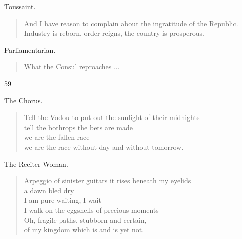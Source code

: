 \documentclass[letterpaper,article,12pt,oneside,notitlepage]{memoir}
\begin{document}
\begin{center}Toussaint.\end{center}

\begin{verse}
\hspace{1cm} And I have reason to complain about the ingratitude of the Republic. \\
Industry is reborn, order reigns, the country is prosperous. \\
\end{verse}

\begin{center}Parliamentarian.\end{center}

\begin{verse}
What the Consul reproaches ... \\
\end{verse}

\clearpage

\href{http://cesaire.elotroalex.com/chiens/chiens/p059.html}{59}

\begin{center}The Chorus.\end{center}

\begin{verse}
Tell the Vodou to put out the sunlight of their midnights \\
tell the bothrops the bets are made \\
we are the fallen race \\
we are the race without day and without tomorrow. \\
\end{verse}

\begin{center}The Reciter Woman.\end{center}

\begin{verse}
Arpeggio of sinister guitars it rises beneath my eyelids \\
a dawn bled dry \\
I am pure waiting, I wait \\
I walk on the eggshells of precious moments \\
Oh, fragile paths, stubborn and certain, \\
of my kingdom which is and is yet not. \\
\end{verse}

\clearpage
\end{document}
